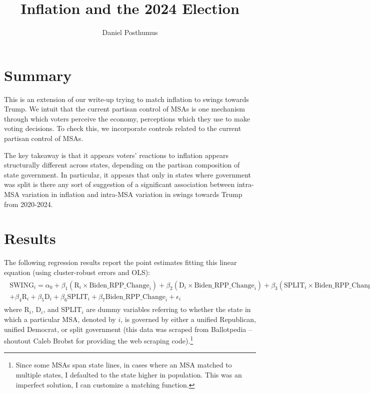\documentclass{article}
\title{Inflation and the 2024 Election}
\author{Daniel Posthumus}
\begin{document}
\maketitle 

\section{Summary}

This is an extension of our write-up trying to match inflation to swings towards Trump. We intuit that the current partisan control of MSAs is one mechanism through which voters perceive the economy, perceptions which they use to make voting decisions. To check this, we incorporate controls related to the current partisan control of MSAs. 

The key takeaway is that it appears voters' reactions to inflation appears structurally different across states, depending on the partisan composition of state government. In particular, it appears that only in states where government was split is there any sort of suggestion of a significant association between intra-MSA variation in inflation and intra-MSA variation in swings towards Trump from 2020-2024.

\section{Results}

The following regression results report the point estimates fitting this linear equation (using cluster-robust errors and OLS):
\begin{gather}
\begin{split}
	\text{SWING}_i = \alpha_0 + \beta_1 (\text{R}_i \times \text{Biden\_RPP\_Change}_i) + \beta_2 (\text{D}_i \times \text{Biden\_RPP\_Change}_i) + \beta_3 (\text{SPLIT}_i \times \text{Biden\_RPP\_Change}_i)  \\
	+ \beta_4 \text{R}_i + \beta_5 \text{D}_i + \beta_6 \text{SPLIT}_i + \beta_7 \text{Biden\_RPP\_Change}_i + \epsilon_i
\end{split}
\end{gather}
where R$_i$, D$_i$, and SPLIT$_i$ are dummy variables referring to whether the state in which a particular MSA, denoted by $i$, is governed by either a unified Republican, unified Democrat, or split government (this data was scraped from Ballotpedia -- shoutout Caleb Brobst for providing the web scraping code).\footnote{Since some MSAs span state lines, in cases where an MSA matched to multiple states, I defaulted to the state higher in population. This was an imperfect solution, I can customize a matching function.}
\end{document}
